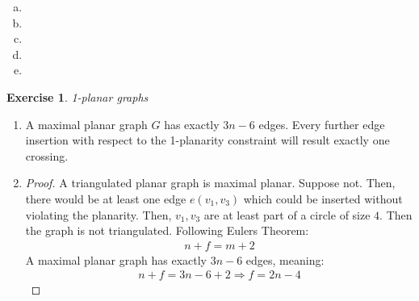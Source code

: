 \documentclass[a4paper,12pt,headsepline]{scrartcl}
\newtheorem{aufgabe}{Exercise}
\begin{document}
\begin{enumerate}[b)]
	\item
	\item 
	\item 
	\item
	\item
\end{enumerate}
\newpage
\begin{aufgabe}1-planar graphs
\end{aufgabe}
\begin{enumerate}
	\item A maximal planar graph $G$ has exactly $3n-6$ edges. Every further edge insertion with respect to the 1-planarity constraint will result exactly one crossing. 
	\item 
	\begin{proof}
		A triangulated planar graph is maximal planar. Suppose not. Then, there would be at least one edge $e (v_1,v_3)$ which could be inserted without violating the planarity. Then, $v_1,v_3$ are at least part of a circle of size $4$. Then the graph is not triangulated. Following Eulers Theorem:
		\begin{align*}
		n + f = m + 2
		\end{align*}
		A maximal planar graph has exactly $3n-6$ edges, meaning:
		\begin{align*}
		n + f = 3n-6 + 2   \Rightarrow f = 2n-4
		\end{align*}
	\end{proof}
\end{enumerate}
\end{document}
